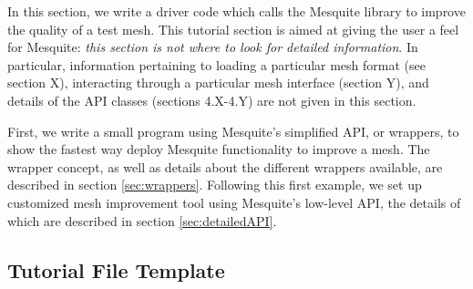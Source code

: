 \documentclass[letter]{report}
\begin{document}
In this section, we write a driver code which calls the Mesquite
library to improve the quality of a test mesh. This tutorial section
is aimed at giving the user a feel for Mesquite: \emph{this section is not
where to look for detailed information}. In particular, information
pertaining to loading a particular mesh format (see section X), 
interacting through a particular mesh interface (section Y), 
and details of the API classes (sections 4.X-4.Y) are not
given in this section.

First, we write a small program using Mesquite's simplified API, or
wrappers, to show the fastest way deploy Mesquite functionality to
improve a mesh.  The wrapper concept, as well as details about the
different wrappers available, are described in section
\ref{sec:wrappers}.  Following this first example, we set up customized mesh
improvement tool using Mesquite's low-level API, the details of which
are described in section \ref{sec:detailedAPI}.

\subsection{Tutorial File Template}
\label{sec:tutfile}
\end{document}

